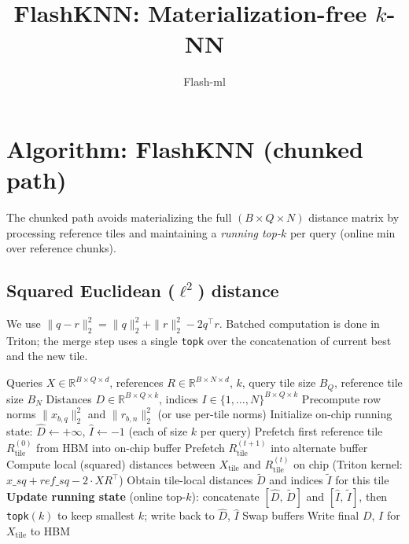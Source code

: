 \documentclass[11pt]{article}
\title{FlashKNN: Materialization-free $k$-NN}
\author{Flash-ml}
\date{}
\begin{document}
\maketitle

\section*{Algorithm: FlashKNN (chunked path)}

The chunked path avoids materializing the full $(B \times Q \times N)$ distance matrix by processing reference tiles and maintaining a \emph{running top-$k$} per query (online min over reference chunks).

\subsection*{Squared Euclidean ($\ell^2$) distance}

We use $\|q - r\|_2^2 = \|q\|_2^2 + \|r\|_2^2 - 2 q^\top r$. Batched computation is done in Triton; the merge step uses a single \texttt{topk} over the concatenation of current best and the new tile.

\begin{algorithm}[H]
\caption{FlashKNN (materialization-free assignment)}
\begin{algorithmic}[1]
\Require Queries $X \in \mathbb{R}^{B \times Q \times d}$, references $R \in \mathbb{R}^{B \times N \times d}$, $k$, query tile size $B_Q$, reference tile size $B_N$
\Ensure Distances $D \in \mathbb{R}^{B \times Q \times k}$, indices $I \in \{1,\ldots,N\}^{B \times Q \times k}$
\State Precompute row norms $\|x_{b,q}\|_2^2$ and $\|r_{b,n}\|_2^2$ (or use per-tile norms)
\State Initialize on-chip running state: $\widehat{D} \gets +\infty$, $\widehat{I} \gets -1$ (each of size $k$ per query)
\State Prefetch first reference tile $R_{\mathrm{tile}}^{(0)}$ from HBM into on-chip buffer
\State Prefetch $R_{\mathrm{tile}}^{(t+1)}$ into alternate buffer
\EndIf
\State Compute local (squared) distances between $X_{\mathrm{tile}}$ and $R_{\mathrm{tile}}^{(t)}$ on chip (Triton kernel: $x\_sq + ref\_sq - 2 \cdot X R^\top$)
\State Obtain tile-local distances $\widetilde{D}$ and indices $\widetilde{I}$ for this tile
\State \textbf{Update running state} (online top-$k$): concatenate $[\widehat{D},\, \widetilde{D}]$ and $[\widehat{I},\, \widetilde{I}]$, then \texttt{topk}$(k)$ to keep smallest $k$; write back to $\widehat{D}$, $\widehat{I}$
\State Swap buffers
\EndFor
\State Write final $D$, $I$ for $X_{\mathrm{tile}}$ to HBM
\EndFor
\end{algorithmic}
\end{algorithm}
\end{document}
